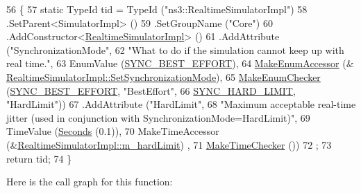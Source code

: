 \begin{DoxyCode}
56 \{
57   \textcolor{keyword}{static} TypeId tid = TypeId (\textcolor{stringliteral}{"ns3::RealtimeSimulatorImpl"})
58     .SetParent<SimulatorImpl> ()
59     .SetGroupName (\textcolor{stringliteral}{"Core"})
60     .AddConstructor<\hyperlink{classns3_1_1RealtimeSimulatorImpl_a4727f4ce08c40210d4139d88db084e59}{RealtimeSimulatorImpl}> ()
61     .AddAttribute (\textcolor{stringliteral}{"SynchronizationMode"}, 
62                    \textcolor{stringliteral}{"What to do if the simulation cannot keep up with real time."},
63                    EnumValue (\hyperlink{classns3_1_1RealtimeSimulatorImpl_a97b84e6926b9602a6d7c7326bf485807aa22b68b600e38987c93c0b3eb786aefe}{SYNC\_BEST\_EFFORT}),
64                    \hyperlink{namespacens3_af5050739867ce63896dec011e332c8ec}{MakeEnumAccessor} (&
      \hyperlink{classns3_1_1RealtimeSimulatorImpl_ae06074719bc5fe676498b8267bc5a81b}{RealtimeSimulatorImpl::SetSynchronizationMode}),
65                    \hyperlink{namespacens3_a48832781a2b521d3d0091e05ece30615}{MakeEnumChecker} (\hyperlink{classns3_1_1RealtimeSimulatorImpl_a97b84e6926b9602a6d7c7326bf485807aa22b68b600e38987c93c0b3eb786aefe}{SYNC\_BEST\_EFFORT}, \textcolor{stringliteral}{"BestEffort"},
66                                     \hyperlink{classns3_1_1RealtimeSimulatorImpl_a97b84e6926b9602a6d7c7326bf485807ada42280d3e94930f3335552b4a93a36d}{SYNC\_HARD\_LIMIT}, \textcolor{stringliteral}{"HardLimit"}))
67     .AddAttribute (\textcolor{stringliteral}{"HardLimit"}, 
68                    \textcolor{stringliteral}{"Maximum acceptable real-time jitter (used in conjunction with
       SynchronizationMode=HardLimit)"},
69                    TimeValue (\hyperlink{group__timecivil_ga33c34b816f8ff6628e33d5c8e9713b9e}{Seconds} (0.1)),
70                    MakeTimeAccessor (&\hyperlink{classns3_1_1RealtimeSimulatorImpl_a9c3322bfb7203676b5a50f3ac5e4f31f}{RealtimeSimulatorImpl::m\_hardLimit})
      ,
71                    \hyperlink{group__time_ga7032965bd4afa578691d88c09e4481c1}{MakeTimeChecker} ())
72   ;
73   \textcolor{keywordflow}{return} tid;
74 \}
\end{DoxyCode}


Here is the call graph for this function\+:


